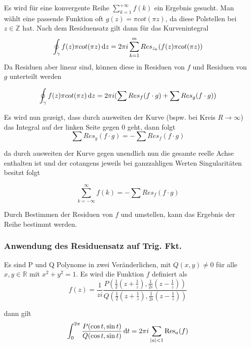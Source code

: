
Es wird für eine konvergente Reihe $\sum_{k=1}^{+\infty}f(k)$ ein Ergebnis gesucht. Man wählt eine passende Funktion oft $g(z)=\pi cot(\pi z)$, da diese Polstellen bei $z\in \mathbb{Z}$ hat. Nach dem Residuensatz gilt dann für das Kurvenintegral
\begin{equation*}
    \oint_{\gamma}f(z)\pi cot(\pi z)\mathop{}\!\mathrm{d} z = 2\pi i \sum_{k=1}^m Res_{z_k}(f(z)\pi cot(\pi z))
\end{equation*}
Da Residuen aber linear sind, können diese in Residuen von $f$ und Residuen von $g$ unterteilt werden

\begin{equation*}
    \oint_{\gamma}f(z)\pi cot(\pi z)\mathop{}\!\mathrm{d} z = 2\pi i(\sum Res_f(f\cdot g) + \sum Res_g(f\cdot g))
\end{equation*}

Es wird nun gezeigt, dass durch ausweiten der Kurve (bspw. bei Kreis $R\to \infty$) das Integral auf der linken Seite gegen 0 geht, dann folgt
\begin{equation*}
    \sum Res_g(f\cdot g) = - \sum Res_f(f\cdot g)
\end{equation*}

da durch ausweiten der Kurve gegen unendlich nun die gesamte reelle Achse enthalten ist und der cotangens jeweils bei ganzzahligen Werten Singularitäten besitzt folgt

\begin{equation*}
    \sum_{k=-\infty}^{\infty}f(k) = - \sum Res_f(f\cdot g)
\end{equation*}

Durch Bestimmen der Residuen von $f$ und umstellen, kann das Ergebnis der Reihe bestimmt werden.

\subsubsection{Anwendung des Residuensatz auf Trig. Fkt.}
Es sind P und Q Polynome in zwei Veränderlichen, mit $Q(x,y)\neq 0$ für alle $x,y\in\mathbb{R}$ mit $x^2+y^2=1$. Es wird die Funktion $f$ definiert als 
\begin{equation*}
    f(z)=\frac{1}{zi}\frac{P(\frac{1}{2}(z+\frac{1}{z}),\frac{1}{2i}(z-\frac{1}{z}))}{Q(\frac{1}{2}(z+\frac{1}{z}),\frac{1}{2i}(z-\frac{1}{z}))}
\end{equation*}

dann gilt
\begin{equation*}
    \int_{0}^{2\pi} \frac{P(\cos{t},\sin{t})}{Q(\cos{t},\sin{t})}\mathop{}\!\mathrm{d} t = 2\pi i\sum_{|a|<1}\operatorname{Res}_a(f)
\end{equation*}

